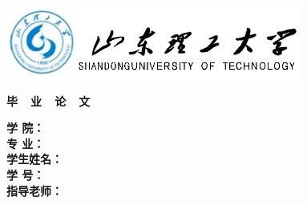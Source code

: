 {
  \setlength{\parindent}{0em}

  {
    \linespread{1}
    \begin{flushleft}
      \includegraphics[height=23.8mm]{data/cover-zh/logo.eps}
    \end{flushleft}

    \vspace{2em}
    
    {
      \heiti\sishiwu\bfseries
      \centering
      毕~~业~~论~~文 \par
    }
    \vspace{6em}
    
    {
      \heiti\erhao\bfseries
      \centering
      {\sduttitlec} \par
    }
    
  }
  

  \vspace{12em}

  {
    \linespread{1.6}
    \songti\xiaosan\bfseries
    \centering
    \newlength{\titlelength}
    \setlength{\titlelength}{18em}
    学 \qquad 院： \; \underline{\makebox[\titlelength]{\sdutschoolc}}\\
    专 \qquad 业： \; \underline{\makebox[\titlelength]{\sdutmajorc}} \\
    学生姓名： \; \underline{\makebox[\titlelength]{\sdutstudentnamec}} \\
    学 \qquad 号： \; \underline{\makebox[\titlelength]{\sdutstudentidc}} \\
    指导老师： \; \underline{\makebox[\titlelength]{\instructorc}} \par
  }
  \vfill
  {
    \songti\sihao\bfseries
      \centering
      \sdutdatec \par
  }
}
